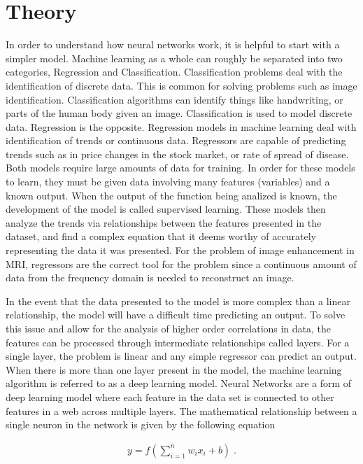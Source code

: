 \documentclass[14pt]{extreport}
\begin{document}
    \section*{Theory}
        In order to understand how neural networks work, it is helpful to start with a simpler model. Machine learning as a whole can roughly be separated into two categories, Regression and Classification. Classification problems deal with the identification of discrete data. This is common for solving problems such as image identification. Classification algorithms can identify things like handwriting, or parts of the human body given an image. Classification is used to model discrete data. Regression is the opposite. Regression models in machine learning deal with identification of trends or continuous data. Regressors are capable of predicting trends such as in price changes in the stock market, or rate of spread of disease. Both models require large amounts of data for training. In order for these models to learn, they must be given data involving many features (variables) and a known output. When the output of the function being analized is known, the development of the model is called supervised learning. These models then analyze the trends via relationships between the features presented in the dataset, and find a complex equation that it deems worthy of accurately representing the data it was presented. For the problem of image enhancement in MRI, regressors are the correct tool for the problem since a continuous amount of data from the frequency domain is needed to reconstruct an image. 

        In the event that the data presented to the model is more complex than a linear relationship, the model will have a difficult time predicting an output. To solve this issue and allow for the analysis of higher order correlations in data, the features can be processed through intermediate relationships called layers. For a single layer, the problem is linear and any simple regressor can predict an output. When there is more than one layer present in the model, the machine learning algorithm is referred to as a deep learning model. Neural Networks are a form of deep learning model where each feature in the data set is connected to other features in a web across multiple layers. The mathematical relationship between a single neuron in the network is given by the following equation \cite{Gazit_2024}
        
        \begin{align}
           y = f\left(\sum_{i = 1}^n w_i x_i + b \right) \;.
        \end{align}
\end{document}
